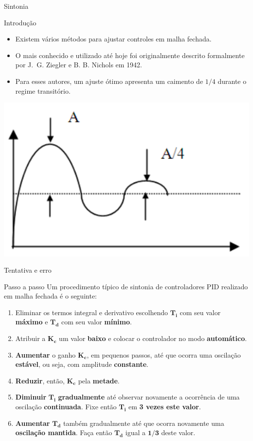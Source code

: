 \begin{frame}{Sintonia}
	\begin{block}{Introdução}
		\begin{itemize}
			\item Existem vários métodos para ajustar controles em malha fechada.
			\item O mais conhecido e utilizado até hoje foi originalmente descrito formalmente por J. G. Ziegler e B. B. Nichols em 1942.
			\item Para esses autores, um ajuste ótimo apresenta um caimento de $ 1/4 $ durante o regime transitório.
		\end{itemize}
	\end{block}

	\centering
	\includegraphics[width=0.5\linewidth]{Figuras/Ch14/fig1}
\end{frame}


\begin{frame}{Tentativa e erro}
	\begin{block}{Passo a passo}		
		Um procedimento típico de sintonia de controladores PID realizado em malha fechada é o seguinte:
		\begin{enumerate}
			\item Eliminar os termos integral e derivativo escolhendo $ \bm{T_i} $ com seu valor \textbf{máximo} e $ \bm{T_d} $ com seu valor \textbf{mínimo}.
			\item Atribuir a $ \bm{K_c} $ um valor \textbf{baixo} e colocar o controlador no modo \textbf{automático}.
			\item \textbf{Aumentar} o ganho $ \bm{K_c} $, em pequenos passos, até que ocorra uma oscilação \textbf{estável}, ou seja, com amplitude \textbf{constante}.			
			\item \textbf{Reduzir}, então, $ \bm{K_c} $ pela \textbf{metade}.		
			\item \textbf{Diminuir} $ \bm{T_i} $ \textbf{gradualmente} até observar novamente a ocorrência de uma oscilação \textbf{continuada}. Fixe então $ \bm{T_i} $ em \textbf{3 vezes este valor}.
			\item \textbf{Aumentar} $ \bm{T_d} $ também gradualmente até que ocorra novamente uma \textbf{oscilação mantida}. Faça então $ \bm{T_d} $ igual a $ \bm{1/3} $ deste valor.
		\end{enumerate}
	\end{block}
\end{frame}


